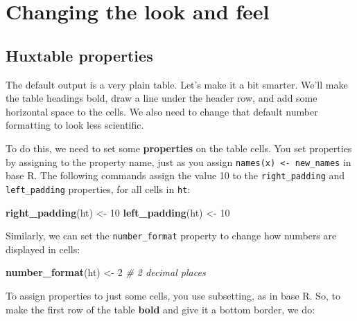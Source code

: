 \documentclass[]{article}
\newenvironment{Shaded}{\begin{snugshade}}{\end{snugshade}}
\newcommand{\CommentTok}[1]{\textcolor[rgb]{0.56,0.35,0.01}{\textit{#1}}}
\newcommand{\DecValTok}[1]{\textcolor[rgb]{0.00,0.00,0.81}{#1}}
\newcommand{\KeywordTok}[1]{\textcolor[rgb]{0.13,0.29,0.53}{\textbf{#1}}}
\newcommand{\NormalTok}[1]{#1}
\newcommand{\StringTok}[1]{\textcolor[rgb]{0.31,0.60,0.02}{#1}}
\begin{document}
\FloatBarrier

\hypertarget{changing-the-look-and-feel}{%
\section{Changing the look and feel}\label{changing-the-look-and-feel}}

\hypertarget{huxtable-properties}{%
\subsection{Huxtable properties}\label{huxtable-properties}}

The default output is a very plain table. Let's make it a bit smarter.
We'll make the table headings bold, draw a line under the header row,
and add some horizontal space to the cells. We also need to change that
default number formatting to look less scientific.

To do this, we need to set some \textbf{properties} on the table cells.
You set properties by assigning to the property name, just as you assign
\texttt{names(x)\ \textless{}-\ new\_names} in base R. The following
commands assign the value 10 to the \texttt{right\_padding} and
\texttt{left\_padding} properties, for all cells in \texttt{ht}:

\begin{Shaded}
\begin{Highlighting}[]
\KeywordTok{right_padding}\NormalTok{(ht) <-}\StringTok{ }\DecValTok{10}
\KeywordTok{left_padding}\NormalTok{(ht)  <-}\StringTok{ }\DecValTok{10}
\end{Highlighting}
\end{Shaded}

\FloatBarrier

Similarly, we can set the \texttt{number\_format} property to change how
numbers are displayed in cells:

\begin{Shaded}
\begin{Highlighting}[]
\KeywordTok{number_format}\NormalTok{(ht) <-}\StringTok{ }\DecValTok{2}    \CommentTok{# 2 decimal places}
\end{Highlighting}
\end{Shaded}

\FloatBarrier

To assign properties to just some cells, you use subsetting, as in base
R. So, to make the first row of the table \textbf{bold} and give it a
bottom border, we do:
\end{document}
